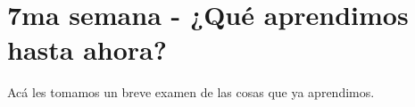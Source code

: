 \chapter{7ma semana - ¿Qué aprendimos hasta ahora?}
Acá les tomamos un breve examen de las cosas que ya aprendimos.
